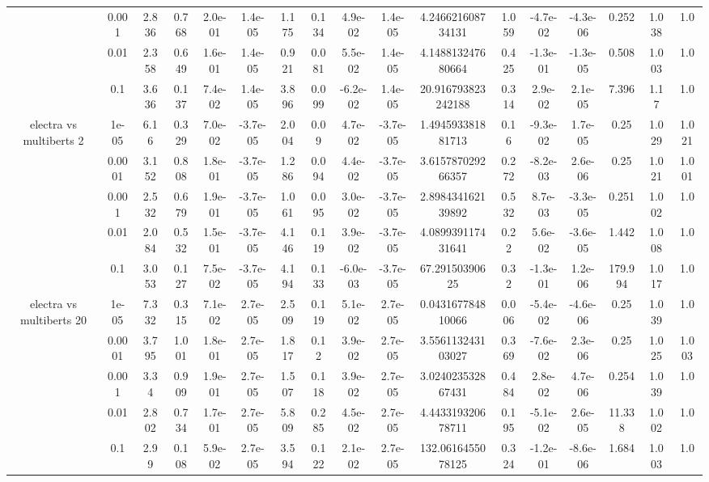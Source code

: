 \begin{tabular}{|c|c|c|c|c|c|c|c|c|c|c|c|c|c|c|c|c|}
 & 0.001 & 2.836 & 0.768 & 2.0e-01 & 1.4e-05 & 1.175 & 0.134 & 4.9e-02 & 1.4e-05 & 4.246621608734131 & 1.059 & -4.7e-02 & -4.3e-06 & 0.252 & 1.038 & 1.0 \\
 & 0.01 & 2.358 & 0.649 & 1.6e-01 & 1.4e-05 & 0.921 & 0.081 & 5.5e-02 & 1.4e-05 & 4.148813247680664 & 0.425 & -1.3e-01 & -1.3e-05 & 0.508 & 1.003 & 1.0 \\
 & 0.1 & 3.636 & 0.137 & 7.4e-02 & 1.4e-05 & 3.896 & 0.099 & -6.2e-02 & 1.4e-05 & 20.916793823242188 & 0.314 & 2.9e-02 & 2.1e-05 & 7.396 & 1.17 & 1.0 \\
\hline
\multirow{5}{*}{electra  vs multiberts 2} & 1e-05 & 6.16 & 0.329 & 7.0e-02 & -3.7e-05 & 2.004 & 0.09 & 4.7e-02 & -3.7e-05 & 1.494593381881713 & 0.16 & -9.3e-02 & 1.7e-05 & 0.25 & 1.029 & 1.021 \\
 & 0.0001 & 3.152 & 0.808 & 1.8e-01 & -3.7e-05 & 1.286 & 0.094 & 4.4e-02 & -3.7e-05 & 3.615787029266357 & 0.272 & -8.2e-03 & 2.6e-06 & 0.25 & 1.021 & 1.001 \\
 & 0.001 & 2.532 & 0.679 & 1.9e-01 & -3.7e-05 & 1.061 & 0.095 & 3.0e-02 & -3.7e-05 & 2.898434162139892 & 0.532 & 8.7e-03 & -3.3e-05 & 0.251 & 1.002 & 1.0 \\
 & 0.01 & 2.084 & 0.532 & 1.5e-01 & -3.7e-05 & 4.146 & 0.119 & 3.9e-02 & -3.7e-05 & 4.089939117431641 & 0.22 & 5.6e-02 & -3.6e-05 & 1.442 & 1.008 & 1.0 \\
 & 0.1 & 3.053 & 0.127 & 7.5e-02 & -3.7e-05 & 4.194 & 0.133 & -6.0e-03 & -3.7e-05 & 67.29150390625 & 0.32 & -1.3e-01 & 1.2e-06 & 179.994 & 1.017 & 1.0 \\
\hline
\multirow{5}{*}{electra  vs multiberts 20} & 1e-05 & 7.332 & 0.315 & 7.1e-02 & 2.7e-05 & 2.509 & 0.119 & 5.1e-02 & 2.7e-05 & 0.043167784810066 & 0.006 & -5.4e-02 & -4.6e-06 & 0.25 & 1.039 & 1.0 \\
 & 0.0001 & 3.795 & 1.001 & 1.8e-01 & 2.7e-05 & 1.817 & 0.12 & 3.9e-02 & 2.7e-05 & 3.556113243103027 & 0.369 & -7.6e-02 & 2.3e-06 & 0.25 & 1.025 & 1.003 \\
 & 0.001 & 3.34 & 0.909 & 1.9e-01 & 2.7e-05 & 1.507 & 0.118 & 3.9e-02 & 2.7e-05 & 3.024023532867431 & 0.484 & 2.8e-02 & 4.7e-06 & 0.254 & 1.039 & 1.0 \\
 & 0.01 & 2.802 & 0.734 & 1.7e-01 & 2.7e-05 & 5.809 & 0.285 & 4.5e-02 & 2.7e-05 & 4.443319320678711 & 0.195 & -5.1e-02 & 2.6e-05 & 11.338 & 1.002 & 1.0 \\
 & 0.1 & 2.99 & 0.108 & 5.9e-02 & 2.7e-05 & 3.594 & 0.122 & 2.1e-02 & 2.7e-05 & 132.0616455078125 & 0.324 & -1.2e-01 & -8.6e-06 & 1.684 & 1.003 & 1.0 \\

\end{tabular}
